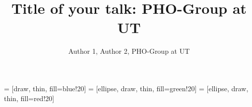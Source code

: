 \newcommand{\ms}[1]{\mathcal{#1}} %
\newcommand{\Range}{{\mc{R}}}
\newcommand{\N}{\mathcal{N}} 
\newcommand{\A}{{\ms{A}}}

\def\edgedist{2.5}

 = [draw, thin, fill=blue!20]
 = [ellipse, draw, thin, fill=green!20]
 = [ellipse, draw, thin, fill=red!20]

\title{
  {Title of your talk: PHO-Group at UT}
  }

\author{Author 1, Author 2, PHO-Group at UT}


\date[Learn2Solve]{%
}
